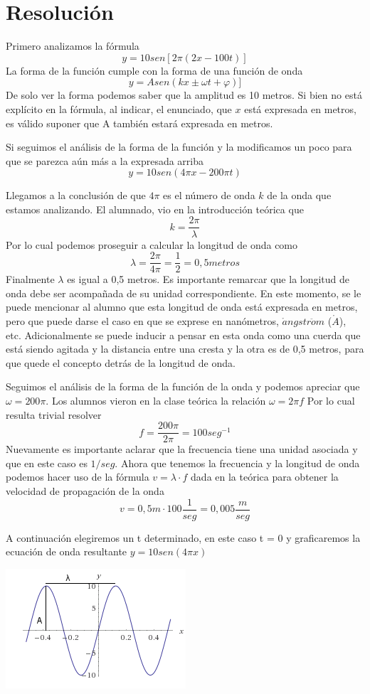 \documentclass[spanish] {article}
\begin{document}
\section{Resolución}
Primero analizamos la fórmula
$$y = 10 sen [2 \pi (2x- 100 t)]$$
La forma de la función cumple con la forma de una función de onda
$$y = A sen (kx \pm \omega t + \varphi)]$$
De solo ver la forma podemos saber que la amplitud es 10 metros. Si bien no está explícito en la fórmula, al indicar, el enunciado, que $x$ está expresada en metros, es válido suponer que A también estará expresada en metros.

Si seguimos el análisis de la forma de la función y la modificamos un poco para que se parezca aún más a la expresada arriba
$$y = 10 sen  (4 \pi x- 200 \pi t)$$

Llegamos a la conclusión de que $4 \pi$ es el número de onda $k$ de la onda que estamos analizando. El alumnado, vio en la introducción teórica que 
$$ k = \frac{2\pi}{\lambda}$$
Por lo cual podemos proseguir a calcular la longitud de onda como
$$ \lambda = \frac{2\pi}{4\pi} = \frac{1}{2} = 0,5 metros$$ 
Finalmente $\lambda$ es igual a 0,5 metros. Es importante remarcar que la longitud de onda debe ser acompañada de su unidad correspondiente. En este momento, se le puede mencionar al alumno que esta longitud de onda está expresada en metros, pero que puede darse el caso en que se exprese en nanómetros, $\mathring{a}ngstr\ddot{o}m$ ($\mathring{A}$), etc.
Adicionalmente se puede inducir a pensar en esta onda como una cuerda que está siendo agitada y la distancia entre una cresta y la otra es de 0,5 metros, para que quede el concepto detrás de la longitud de onda.

Seguimos el análisis de la forma de la función de la onda y podemos apreciar que $ \omega = 200 \pi $. Los alumnos vieron en la clase teórica la relación $ \omega = 2 \pi f $
Por lo cual resulta trivial resolver
$$ f = \frac{200 \pi}{2 \pi} = 100 seg^{-1}$$
Nuevamente es importante aclarar que la frecuencia tiene una unidad asociada y que en este caso es $1/seg$.
Ahora que tenemos la frecuencia y la longitud de onda podemos hacer uso de la fórmula $v = \lambda \cdot f$ dada en la teórica para obtener la velocidad de propagación de la onda
$$v = 0,5m \cdot 100 \frac{1}{seg} = 0,005 \frac{m}{seg}$$

A continuación elegiremos un t determinado, en este caso t = 0 y graficaremos la ecuación de onda resultante $y=10 sen(4 \pi x)$

\includegraphics{plot2}
\end{document}
